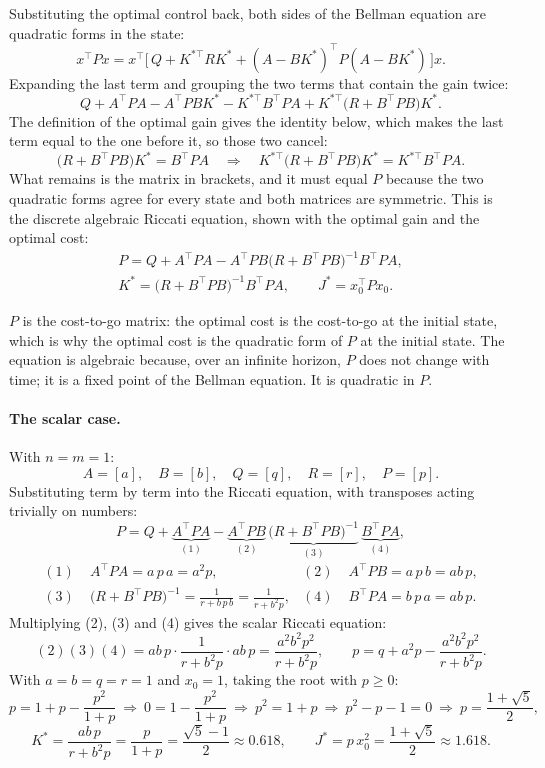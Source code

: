 \documentclass[11pt]{article}
\begin{document}
Substituting the optimal control back, both sides of the Bellman equation are quadratic forms in
the state:
\[
  x^\top P x = x^\top \Big[\, Q + K^{*\top} R K^* + (A - B K^*)^\top P (A - B K^*) \,\Big] x .
\]
Expanding the last term and grouping the two terms that contain the gain twice:
\[
  Q + A^\top P A - A^\top P B K^* - K^{*\top} B^\top P A + K^{*\top} \big(R + B^\top P B\big) K^* .
\]
The definition of the optimal gain gives the identity below, which makes the last term equal to the
one before it, so those two cancel:
\[
  \big(R + B^\top P B\big) K^* = B^\top P A
  \quad\Longrightarrow\quad
  K^{*\top} \big(R + B^\top P B\big) K^* = K^{*\top} B^\top P A .
\]
What remains is the matrix in brackets, and it must equal $P$ because the two quadratic forms agree
for every state and both matrices are symmetric. This is the discrete algebraic Riccati equation,
shown with the optimal gain and the optimal cost:
\begin{gather*}
  P = Q + A^\top P A - A^\top P B \big(R + B^\top P B\big)^{-1} B^\top P A, \\
  K^* = \big(R + B^\top P B\big)^{-1} B^\top P A, \qquad J^* = x_0^\top P x_0 .
\end{gather*}

$P$ is the cost-to-go matrix: the optimal cost is the cost-to-go at the initial state, which is why
the optimal cost is the quadratic form of $P$ at the initial state. The equation is algebraic
because, over an infinite horizon, $P$ does not change with time; it is a fixed point of the Bellman
equation. It is quadratic in $P$.

\paragraph{The scalar case.} With $n = m = 1$:
\[
  A = [a], \quad B = [b], \quad Q = [q], \quad R = [r], \quad P = [p].
\]
Substituting term by term into the Riccati equation, with transposes acting trivially on numbers:
\[
  P = Q + \underbrace{A^\top P A}_{(1)} - \underbrace{A^\top P B}_{(2)}\,
  \underbrace{\big(R + B^\top P B\big)^{-1}}_{(3)}\, \underbrace{B^\top P A}_{(4)},
\]
\begin{align*}
  (1)\;& A^\top P A = a\, p\, a = a^2 p, &
  (2)\;& A^\top P B = a\, p\, b = a b\, p, \\
  (3)\;& \big(R + B^\top P B\big)^{-1} = \frac{1}{r + b\, p\, b} = \frac{1}{r + b^2 p}, &
  (4)\;& B^\top P A = b\, p\, a = a b\, p .
\end{align*}
Multiplying (2), (3) and (4) gives the scalar Riccati equation:
\[
  (2)(3)(4) = a b\, p \cdot \frac{1}{r + b^2 p} \cdot a b\, p = \frac{a^2 b^2 p^2}{r + b^2 p},
  \qquad
  p = q + a^2 p - \frac{a^2 b^2 p^2}{r + b^2 p} .
\]
With $a = b = q = r = 1$ and $x_0 = 1$, taking the root with $p \ge 0$:
\[
  p = 1 + p - \frac{p^2}{1 + p}
  \ \Longrightarrow\ 0 = 1 - \frac{p^2}{1 + p}
  \ \Longrightarrow\ p^2 = 1 + p
  \ \Longrightarrow\ p^2 - p - 1 = 0
  \ \Longrightarrow\ p = \frac{1 + \sqrt{5}}{2},
\]
\[
  K^* = \frac{a b\, p}{r + b^2 p} = \frac{p}{1 + p} = \frac{\sqrt{5} - 1}{2} \approx 0.618,
  \qquad
  J^* = p\, x_0^2 = \frac{1 + \sqrt{5}}{2} \approx 1.618 .
\]
\end{document}
